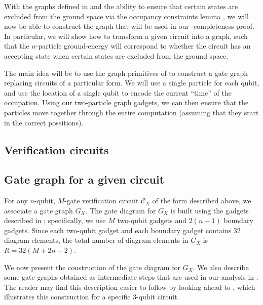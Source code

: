 \documentclass[../thesis-main/thesis-main]{subfiles}
\begin{document}
With the graphs defined in  and the ability to ensure that certain states are excluded from the ground space via the occupancy constraints lemma , we will now be able to construct the graph that will be used in our \QMA-completeness proof.   In particular, we will show how to transform a given circuit into a graph, such that the $n$-particle ground-energy will correspond to whether the circuit has an accepting state when certain states are excluded from the ground space.  

The main idea will be to use the graph primitives of  to construct a gate graph replacing circuits of a particular form.  We will use a single particle for each qubit, and use the location of a single qubit to encode the current ``time'' of the occupation.  Using our two-particle graph gadgets, we can then ensure that the particles move together through the entire computation (assuming that they start in the correct possitions).  

\subsection{Verification circuits}


\subsection{Gate graph for a given circuit}
For any $n$-qubit, $M$-gate verification circuit $\mathcal{C}_{X}$ of the form described above, we associate a gate graph $G_X$. The gate diagram for $G_X$ is built using the gadgets described in ; specifically, we use $M$ two-qubit gadgets and $2(n-1)$ boundary gadgets. Since each two-qubit gadget and each boundary gadget contains $32$ diagram elements, the total number of diagram elements in $G_X$ is $R=32(M+2n-2)$.

We now present the construction of the gate diagram for $G_X$.  We also describe some gate graphs obtained as intermediate steps that are used in our analysis in . The reader may find this description easier to follow by looking ahead to , which illustrates this construction for a specific $3$-qubit circuit.
\end{document}
